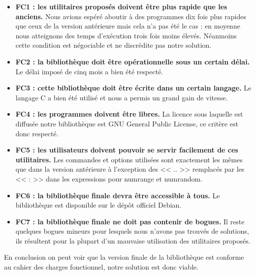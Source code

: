 \begin{itemize}
\item [\textbullet] \textbf{FC1 : les utilitaires propos\'es doivent \^etre plus rapide que les anciens.}
\newline
\normalsize
Nous avions esp\'er\'e aboutir \`a des programmes dix fois plus rapides que ceux de la version ant\'erieure mais cela n'a pas \'et\'e le cas : 
en moyenne nous atteignons des temps d'ex\'ecution trois fois moins \'elev\'es. N\'eanmoins cette condition est n\'egociable et ne discr\'edite pas notre solution.
\item [\textbullet] \textbf{FC2 : la biblioth\`eque doit \^etre op\'erationnelle sous un certain d\'elai.}
\newline
\normalsize
Le d\'elai impos\'e de cinq mois a bien \'et\'e respect\'e.
\item [\textbullet] \textbf{FC3 : cette biblioth\`eque doit \^etre \'ecrite dans un certain langage.}
\newline
\normalsize
Le langage C a bien \'et\'e utilis\'e et nous a permis un grand gain de vitesse.
\item [\textbullet] \textbf{FC4 : les programmes doivent \^etre libres.}
\newline
\normalsize
La licence sous laquelle est diffus\'ee notre biblioth\`eque est GNU General Public License, ce crit\`ere est donc respect\'e.
\item [\textbullet] \textbf{FC5 : les utilisateurs doivent pouvoir se servir facilement de ces utilitaires.}
\newline
\normalsize
Les commandes et options utilis\'ees sont exactement les m\^emes que dans la version ant\'erieure \`a l'exception des << .. >> remplac\'es par les << : >> dans les expressions pour numrange et numrandom.
\item [\textbullet] \textbf{FC6 : la biblioth\`eque finale devra \^etre accessible  \`a tous.}
\newline
\normalsize
Le biblioth\`eque est disponible sur le d\'ep\^ot officiel Debian.
\item [\textbullet] \textbf{FC7 : la biblioth\`eque finale ne doit pas contenir de bogues.}
\newline
\normalsize
Il reste quelques bogues mineurs pour lesquels nous n'avons pas trouv\'es de solutions, ils r\'esultent pour la plupart d'un mauvaise utilisation des utilitaires propos\'es.
\end{itemize}

En conclusion on peut voir que la version finale de la biblioth\`eque est conforme au cahier des charges fonctionnel, notre solution est donc viable.
